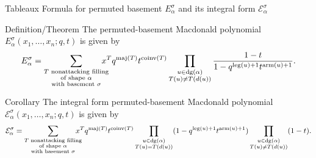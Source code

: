 \documentclass[aspectratio = 1609]{beamer}
\theoremstyle{definition}
\theoremstyle{plain} %
\DeclareMathOperator{\maj}{maj}
\DeclareMathOperator{\coinv}{coinv}
\DeclareMathOperator{\dg}{dg}
\DeclareMathOperator{\leg}{leg}
\DeclareMathOperator{\arm}{arm}
\newcommand{\south}[1]{d({#1})}
\begin{document}
\begin{frame}{Tableaux Formula for permuted basement \(E_\alpha^\sigma\) and its integral form \(\mathcal{E}_\alpha^\sigma\)}
  \begin{block}{Definition/Theorem \parencite{Fer11}}
    The permuted-basement Macdonald polynomial \(E_\alpha^\sigma(x_1, \dots, x_n; q, t)\) is given by
    \[
      E_\alpha^\sigma
      =
      \sum_{\substack{T \text{ nonattacking filling} \\ \text{of shape } \alpha \\ \text{with basement } \sigma}}
      \mkern-18mu
      x^{T}
      q^{\maj(T)}
      t^{\coinv(T)}
      \prod_{\substack{u \in \dg(\alpha) \\ T(u) \neq T(\south{u})}}
      \frac{1 - t}{1 - q^{\leg(u) + 1} t^{\arm(u) + 1}}.
    \]
  \end{block}

  \begin{block}{Corollary}
    The integral form permuted-basement Macdonald polynomial \(\mathcal{E}_\alpha^\sigma(x_1, \dots, x_n; q, t)\) is given by
    \[
      \mathcal{E}_\alpha^\sigma = 
      \sum_{\substack{T \text{ nonattacking filling} \\ \text{of shape } \alpha \\ \text{with basement } \sigma}}
      \mkern-18mu
      x^{T}
      q^{\maj(T)}
      t^{\coinv(T)}
      \prod_{\substack{u \in \dg(\alpha) \\ T(u) = T(\south{u})}}
      (1 - q^{\leg(u) + 1} t^{\arm(u) + 1})
      \prod_{\substack{u \in \dg(\alpha) \\ T(u) \neq T(\south{u})}}
      (1 - t).
    \]
  \end{block}
\end{frame}
\end{document}
